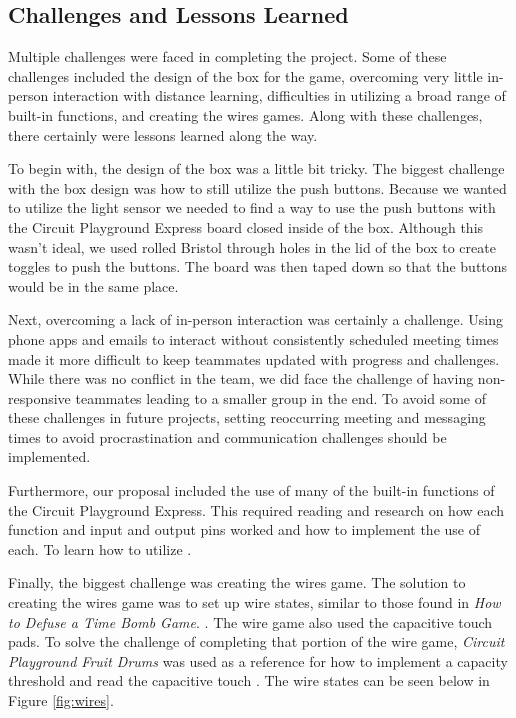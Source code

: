 \documentclass[12pt]{article}
\begin{document}
\subsection{Challenges and Lessons Learned}
Multiple challenges were faced in completing the project.  Some of these challenges included the design of the box for the game, overcoming very little in-person interaction with distance learning, difficulties in utilizing a broad range of built-in functions, and creating the wires games.  Along with these challenges, there certainly were lessons learned along the way.

To begin with, the design of the box was a little bit tricky.  The biggest challenge with the box design was how to still utilize the push buttons.  Because we wanted to utilize the light sensor we needed to find a way to use the push buttons with the Circuit Playground Express board closed inside of the box. Although this wasn't ideal, we used rolled Bristol through holes in the lid of the box to create toggles to push the buttons.  The board was then taped down so that the buttons would be in the same place.

Next, overcoming a lack of in-person interaction was certainly a challenge.  Using phone apps and emails to interact without consistently scheduled meeting times made it more difficult to keep teammates updated with progress and challenges.  While there was no conflict in the team, we did face the challenge of having non-responsive teammates leading to a smaller group in the end.  To avoid some of these challenges in future projects, setting reoccurring meeting and messaging times to avoid procrastination and communication challenges should be implemented.

Furthermore, our proposal included the use of many of the built-in functions of the Circuit Playground Express.  This required reading and research on how each function and input and output pins worked and how to implement the use of each. To learn how to utilize .

Finally, the biggest challenge was creating the wires game.  The solution to creating the wires game was to set up wire states, similar to those found in \textit{How to Defuse a Time Bomb Game}. \cite{instructables-circuits}.  The wire game also used the capacitive touch pads.  To solve the challenge of completing that portion of the wire game, \textit{Circuit Playground Fruit Drums} was used as a reference for how to implement a capacity threshold and read the capacitive touch \cite{fruit-drums}.  The wire states can be seen below in Figure \ref{fig:wires}.
\end{document}
